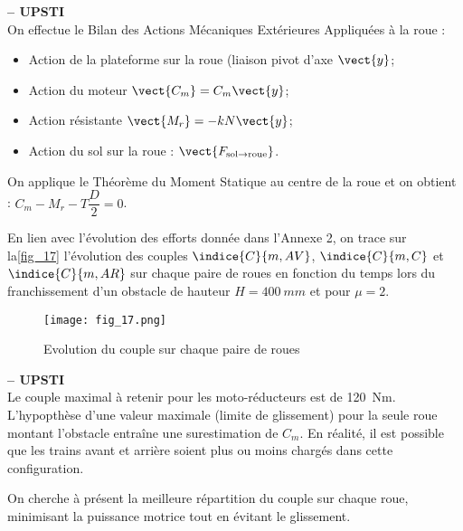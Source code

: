 \ifprof
\begin{corrige}\textbf{ -- UPSTI}\\ 
On effectue le Bilan des Actions Mécaniques Extérieures Appliquées à la roue :
\begin{itemize}
\item Action de la plateforme sur la roue (liaison pivot d’axe $\vect{y}$;
\item Action du moteur $\vect{C_m}=C_m\vect{y}$;
\item Action résistante $\vect{M_r}=-kN\vect{y}$;
\item Action du sol sur la roue : $\vect{F_{\text{sol} \rightarrow \text{roue}}}$.
\end{itemize}

On applique le Théorème du Moment Statique au centre de la roue et on obtient :
$C_m - M_r - T\dfrac{D}{2} = 0$.

\end{corrige}
\else
\fi
\ifprof
\else
En lien avec l'évolution des efforts donnée dans l'Annexe 2, on trace sur la\autoref{fig_17} l'évolution
des couples $\indice{C}{m, AV}$, $\indice{C}{m,C}$ et $\indice{C}{m,AR}$ sur chaque paire de roues en fonction du temps lors du franchissement d'un obstacle de hauteur $H =\SI{400}{mm}$ et pour $\mu=2$.

\begin{figure}[H]
\centering
\texttt{[image: fig\_17.png]}
\caption{Evolution du couple sur chaque paire de roues\label{fig_17}}
\end{figure}
\fi


\ifprof
\begin{corrige}\textbf{ -- UPSTI}\\ 
Le couple maximal à retenir pour les moto-réducteurs est de \SI{120}{Nm}.
L’hypopthèse d’une valeur maximale (limite de glissement) pour la seule roue montant l’obstacle entraîne une surestimation de $C_m$. En réalité, il est possible que les trains avant et arrière soient plus ou moins chargés dans cette configuration.
\end{corrige}
\else
\fi

On cherche à présent la meilleure répartition du couple sur chaque roue, minimisant la puissance
motrice tout en évitant le glissement.


